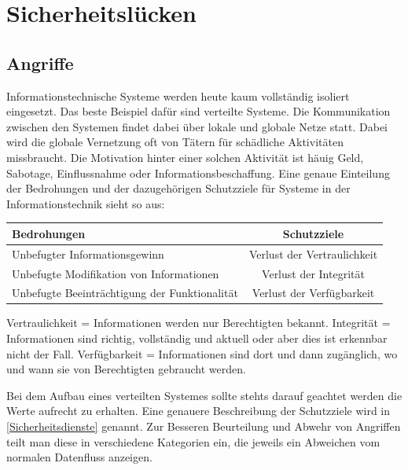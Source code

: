 \chapter{Sicherheitslücken}\label{Sicherheitsluecken}
\section{Angriffe}

Informationstechnische Systeme werden heute kaum vollständig isoliert eingesetzt. Das beste Beispiel
dafür sind verteilte Systeme. Die Kommunikation zwischen den Systemen findet dabei über lokale und globale 
Netze statt. Dabei wird die globale Vernetzung oft von Tätern für schädliche Aktivitäten missbraucht.
Die Motivation hinter einer solchen Aktivität ist häuig Geld, Sabotage, Einflussnahme oder Informationsbeschaffung. 
Eine genaue Einteilung der Bedrohungen und der dazugehörigen Schutzziele für Systeme in der Informationstechnik sieht so aus:

\begin{tabular}[h]{l|c}
    Bedrohungen & Schutzziele \\
    \hline
    Unbefugter Informationsgewinn & Verlust der Vertraulichkeit \\
    Unbefugte Modifikation von Informationen & Verlust der Integrität \\
    Unbefugte Beeinträchtigung der Funktionalität & Verlust der Verfügbarkeit \\
\end{tabular}


Vertraulichkeit = Informationen werden nur Berechtigten bekannt.
\newline
Integrität = Informationen sind richtig, vollständig und aktuell
oder aber dies ist erkennbar nicht der Fall.
\newline
Verfügbarkeit = Informationen sind dort und dann zugänglich,
wo und wann sie von Berechtigten gebraucht werden.

Bei dem Aufbau eines verteilten Systemes sollte stehts darauf geachtet werden die Werte 
aufrecht zu erhalten. Eine genauere Beschreibung der Schutzziele wird in \autoref{Sicherheitsdienste} genannt. 
Zur Besseren Beurteilung und Abwehr von Angriffen teilt man diese in verschiedene Kategorien ein,
die jeweils ein Abweichen vom normalen Datenfluss anzeigen.

